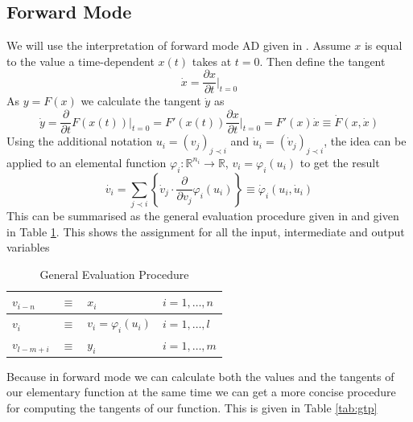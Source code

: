 \documentclass{article}
\begin{document}
\subsection{Forward Mode}

We will use the interpretation of forward mode AD given in \cite{dhamarticle}. Assume $x$ is equal to the value a time-dependent $x(t)$ takes at $t=0$. Then define the tangent 
\begin{equation}
    \dot{x} = \frac{\partial x}{\partial t} \Big|_{t=0}
\end{equation}
As $y = F(x)$ we calculate the tangent $\dot{y}$ as
\begin{equation}
    \Dot{y} = \frac{\partial}{\partial t} F(x (t)) \Big|_{t=0} 
    = F'(x (t)) \frac{\partial x}{\partial t} \Big|_{t=0}
    = F'(x) \Dot{x}
    \equiv \Dot{F}(x, \Dot{x})
\end{equation}
Using the additional notation $u_i = (v_j)_{j \prec i}$ and $\Dot{u}_i = (\Dot{v}_j)_{j \prec i}$, the idea can be applied to an elemental function $\varphi_i : \mathbb{R}^{n_i} \longrightarrow \mathbb{R}$, $v_i = \varphi_i (u_i)$ to get the result
\begin{equation} \label{tangentequ}
    \Dot{v_i} = \sum_{j \prec i} \left\{ \Dot{v}_j \cdot \frac{\partial}{\partial v_j} \varphi_i (u_i) \right\} 
    \equiv \Dot{\varphi}_i(u_i, \Dot{u}_i)
\end{equation}
This can be summarised as the general evaluation procedure given in \cite{evald} and given in Table \ref{tab:gep}.
This shows the assignment for all the input, intermediate and output variables

\begin{table}[h]
    \centering
    \begin{tabular}{|lcll|}
        \hline
        $v_{i-n}$ & $\equiv$ & $x_i$ & $i = 1, \ldots, n$ \\
        \hline
        $v_{i}$ & $\equiv$ & $v_i = \varphi_i (u_i)$ & $i = 1, \ldots, l$ \\
        \hline
        $v_{l-m+i}$ & $\equiv$ & $y_i$ & $i = 1, \ldots, m$ \\
        \hline
    \end{tabular}
    \caption{General Evaluation Procedure}
    \label{tab:gep}
\end{table}

Because in forward mode we can calculate both the values and the tangents of our elementary function at the same time we can get a more concise procedure for computing the tangents of our function. This is given in Table \ref{tab:gtp}
\end{document}
